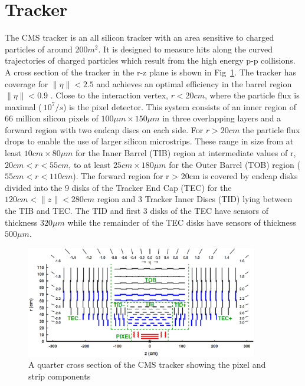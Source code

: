 \section{Tracker}
The CMS tracker is an all silicon tracker with an area sensitive to charged particles of around 200$m^2$. It is designed to measure hits along the
curved trajectories of charged particles which result from the high energy p-p collisions. A cross section of the tracker in the r-z plane is shown in Fig~\ref{TRACKER_SLICE}.
The tracker has coverage for $\|\eta\| < 2.5$ and achieves an optimal efficiency in the barrel region $\|\eta\| < 0.9$ \cite{tracker_performance,tracker_tdr}. 
Close to the interaction vertex, $r < 20cm$, where the particle flux is maximal ($~10^7/s$) is the pixel detector. This system consists of an inner region of 66 million silicon 
pixels of $100\mu m \times 150\mu m$ in three overlapping layers and a forward region with two endcap discs on each side.
For $r > 20cm$ the particle flux drops to enable the use of larger silicon microstrips. These range in size from at least $10cm \times 80\mu m$ for the Inner Barrel (TIB) region 
at intermediate values of r, $20cm < r < 55cm$, to at least $25cm \times 180\mu m$ for the Outer Barrel (TOB) region ($55cm < r < 110cm$). The forward region
for r > 20cm is covered by endcap disks divided into the 9 disks of the Tracker End Cap (TEC) for the $120cm < \|z\| < 280 cm$ region and 
3 Tracker Inner Discs (TID) lying between the TIB and TEC. The TID and first 3 disks of the TEC have sensors of thickness $320\mu m$ while the remainder of the TEC disks
have sensors of thickness $500\mu m$\cite{tracker_tdr}.

\begin{figure}
\centering
    \includegraphics[width=0.9\textwidth]{./Figures/detector/CMS2Dtracker}
  \caption{A quarter cross section of the CMS tracker showing the pixel and strip components \cite{tracker_fig}}
  \label{TRACKER_SLICE}
\end{figure}

